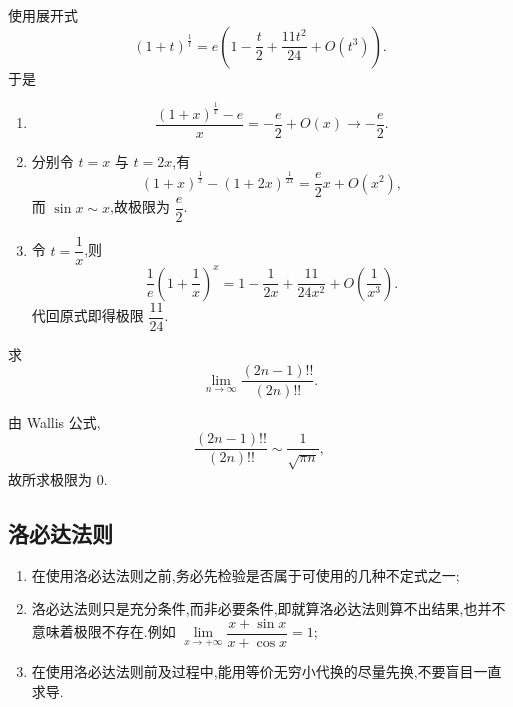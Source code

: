 \begin{solution}
    使用展开式
    \[
        (1+t)^{\frac{1}{t}}
        =e\left(1-\dfrac{t}{2}+\dfrac{11t^2}{24}+O(t^3)\right).
    \]
    于是
    \begin{enumerate}
        \item
              \[
                  \dfrac{(1+x)^{\frac{1}{x}}-e}{x}
                  =-\dfrac{e}{2}+O(x)\longrightarrow-\dfrac{e}{2}.
              \]
        \item 分别令 $t=x$ 与 $t=2x$,有
              \[
                  (1+x)^{\frac{1}{x}}-(1+2x)^{\frac{1}{2x}}
                  =\dfrac{e}{2}x+O(x^2),
              \]
              而 $\sin x\sim x$,故极限为 $\dfrac{e}{2}$.
        \item 令 $t=\dfrac{1}{x}$,则
              \[
                  \dfrac{1}{e}\left(1+\dfrac{1}{x}\right)^x
                  =1-\dfrac{1}{2x}+\dfrac{11}{24x^2}+O\left(\dfrac{1}{x^3}\right).
              \]
              代回原式即得极限 $\dfrac{11}{24}$.
    \end{enumerate}
\end{solution}

\begin{example}
    求
    \[
        \displaystyle\lim\limits_{n\to\infty}\dfrac{(2n-1)!!}{(2n)!!}.
    \]
\end{example}
\exampleblank

\begin{solution}
    由 Wallis 公式,
    \[
        \dfrac{(2n-1)!!}{(2n)!!}\sim\dfrac{1}{\sqrt{\pi n}},
    \]
    故所求极限为 $0$.
\end{solution}



\subsection{洛必达法则}

\begin{enumerate}
    \item 在使用洛必达法则之前,务必先检验是否属于可使用的几种不定式之一;
    \item 洛必达法则只是充分条件,而非必要条件,即就算洛必达法则算不出结果,也并不意味着极限不存在.例如
          $\displaystyle\lim\limits_{x\to+\infty}\dfrac{x+\sin x}{x+\cos x}=1$;
    \item 在使用洛必达法则前及过程中,能用等价无穷小代换的尽量先换,不要盲目一直求导.
\end{enumerate}

